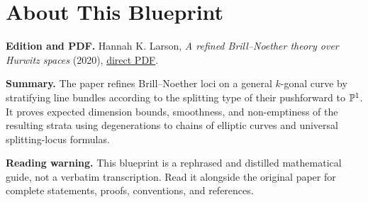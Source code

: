 

\chapter*{About This Blueprint}
\label{refined-brill-noether-theory-hurwitz-spaces-about}

\textbf{Edition and PDF.} Hannah K. Larson, \emph{A refined Brill--Noether
theory over Hurwitz spaces} (2020),
\href{https://arxiv.org/pdf/1907.08597}{direct PDF}.

\textbf{Summary.} The paper refines Brill--Noether loci on a general
$k$-gonal curve by stratifying line bundles according to the splitting type
of their pushforward to $\mathbb{P}^1$. It proves expected dimension bounds,
smoothness, and non-emptiness of the resulting strata using degenerations to
chains of elliptic curves and universal splitting-locus formulas.

\textbf{Reading warning.}
This blueprint is a rephrased and distilled mathematical guide, not a
verbatim transcription. Read it alongside the original paper for complete
statements, proofs, conventions, and references.










